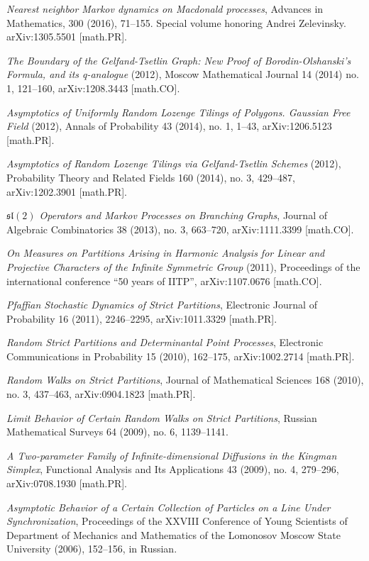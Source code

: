 \documentclass[letterpaper,11pt]{article}
\begin{document}
\begin{etaremune}
    \emph{Nearest neighbor Markov dynamics on 
    Macdonald processes},
    Advances in Mathematics, 300 (2016), 71--155. Special volume honoring Andrei Zelevinsky.
    arXiv:1305.5501 [math.PR].
    \item \emph{The Boundary of the Gelfand-Tsetlin Graph: New Proof of Borodin-Olshanski's Formula, and its q-analogue} (2012), 
    Moscow Mathematical Journal 14 (2014) no. 1, 121--160,
    arXiv:1208.3443 [math.CO].
    \item \emph{Asymptotics of Uniformly Random Lozenge Tilings of Polygons. Gaussian Free Field} (2012), 
    Annals of Probability 43 (2014), no. 1, 1--43,
    arXiv:1206.5123 [math.PR].
    \item \emph{Asymptotics of Random Lozenge Tilings via Gelfand-Tsetlin Schemes} (2012), 
    Probability Theory and Related Fields 160 (2014), no. 3, 429--487,
    arXiv:1202.3901 [math.PR].
    \item \emph{$\mathfrak{sl}(2)$ Operators and Markov Processes on Branching Graphs},
    Journal of Algebraic Combinatorics 38 (2013), no. 3, 663--720,
    arXiv:1111.3399 [math.CO].
    \item \emph{On Measures on Partitions Arising in Harmonic Analysis for Linear and Projective Characters of the Infinite Symmetric Group} (2011), Proceedings of the international conference ``50 years of IITP'', arXiv:1107.0676 [math.CO].
    \item  \emph{Pfaffian Stochastic Dynamics of Strict Partitions},  Electronic Journal of Probability 16 (2011), 2246--2295, arXiv:1011.3329 [math.PR].
    \item \emph{Random Strict Partitions and Determinantal Point Processes}, Electronic Communications in Probability 15 (2010), 162--175, arXiv:1002.2714 [math.PR].
    \item  \emph{Random Walks on Strict Partitions}, Journal of Mathematical Sciences 168 (2010), no. 3, 437--463, arXiv:0904.1823 [math.PR].  
    \item  \emph{Limit Behavior of Certain Random Walks on Strict Partitions}, Russian Mathematical Surveys 64 (2009), no. 6, 1139--1141.
    \item  \emph{A Two-parameter Family of Infinite-dimensional Diffusions in the Kingman Simplex}, Functional Analysis and Its Applications 43 (2009), no. 4, 279--296, arXiv:0708.1930 [math.PR].
     \item 
    \emph{Asymptotic Behavior of a Certain Collection of Particles on a Line Under Synchronization}, Proceedings of the XXVIII Conference of Young Scientists of Department of Mechanics and Mathematics of the Lomonosov Moscow State University (2006), 152--156, in Russian.
\end{etaremune}
\end{document}
